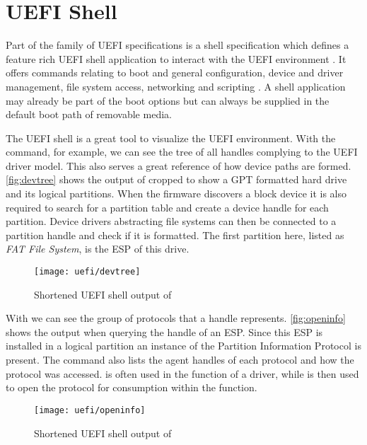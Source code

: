 
\section{\acs{UEFI} Shell}

Part of the family of \ac{UEFI} specifications is a shell specification which defines a feature rich \ac{UEFI} shell application to interact with the \ac{UEFI} environment \cite[Section 1.1]{uefi-shell-spec}.
It offers commands relating to boot and general configuration, device and driver management, file system access, networking \cite[Section 5.1]{uefi-shell-spec} and scripting \cite[Section 4]{uefi-shell-spec}.
A shell application may already be part of the boot options but can always be supplied in the default boot path of removable media.

The \ac{UEFI} shell is a great tool to visualize the \ac{UEFI} environment.
With the  command, for example, we can see the tree of all handles complying to the \ac{UEFI} driver model.
This also serves a great reference of how device paths are formed.
\autoref{fig:devtree} shows the output of  cropped to show a \ac{GPT} formatted hard drive and its logical partitions.
When the firmware discovers a block device it is also required to search for a partition table and create a device handle for each partition.
Device drivers abstracting file systems can then be connected to a partition handle and check if it is formatted.
The first partition here, listed as \emph{FAT File System}, is the \ac{ESP} of this drive.

\begin{figure}[htb]
    \centering
    \texttt{[image: uefi/devtree]}
    \caption{Shortened \ac{UEFI} shell output of }
    \label{fig:devtree}
\end{figure}

With  we can see the group of protocols that a handle represents.
\autoref{fig:openinfo} shows the output when querying the handle of an \ac{ESP}.
Since this \ac{ESP} is installed in a logical partition an instance of the Partition Information Protocol is present.
The command also lists the agent handles of each protocol and how the protocol was accessed.
 is often used in the  function of a driver, while  is then used to open the protocol for consumption within the  function.

\begin{figure}[htb]
    \centering
    \texttt{[image: uefi/openinfo]}
    \caption{Shortened \ac{UEFI} shell output of }
    \label{fig:openinfo}
\end{figure}




